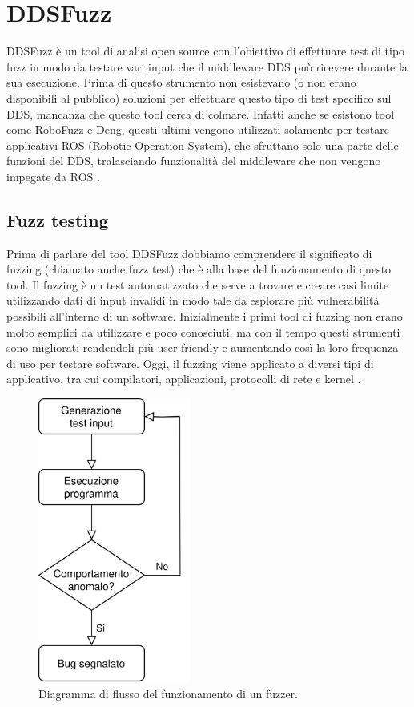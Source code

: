 \section{DDSFuzz}
DDSFuzz è un tool di analisi open source con l'obiettivo di 
effettuare test di tipo fuzz
in modo da testare vari input che il middleware DDS può
ricevere durante la sua esecuzione. Prima di questo strumento 
non esistevano (o non erano disponibili al pubblico) soluzioni
per effettuare questo tipo di test specifico sul DDS, mancanza
che questo tool cerca di colmare. Infatti anche se esistono tool 
come RoboFuzz e Deng, questi ultimi vengono utilizzati solamente
per testare applicativi ROS (Robotic Operation System), che 
sfruttano solo una parte delle funzioni del DDS, tralasciando
funzionalità del middleware che non vengono impegate
da ROS \cite{10.1145/3691620.3695073}.


\subsection{Fuzz testing}
Prima di parlare del tool DDSFuzz dobbiamo comprendere 
il significato di fuzzing (chiamato anche fuzz test) che è
alla base del funzionamento di questo tool. Il fuzzing è un test
automatizzato che serve a trovare e creare casi limite utilizzando
dati di input invalidi in modo tale da esplorare più vulnerabilità
possibili all'interno di un software. 
Inizialmente i primi tool di fuzzing non erano molto 
semplici da utilizzare e poco conosciuti, 
ma con il tempo questi strumenti
sono migliorati rendendoli più user-friendly e aumentando così la 
loro frequenza di uso per testare software. Oggi, il fuzzing viene
applicato a diversi tipi di applicativo, tra cui compilatori, 
applicazioni, protocolli di rete e kernel \cite{8371326}.

\begin{figure}[H]
    \centering
    \includegraphics[width=5cm, keepaspectratio]{img/Diagramma di flusso fuzzer.jpg}
    \caption{Diagramma di flusso del funzionamento di un fuzzer.}
    \label{funzionamento fuzzer}
\end{figure}

